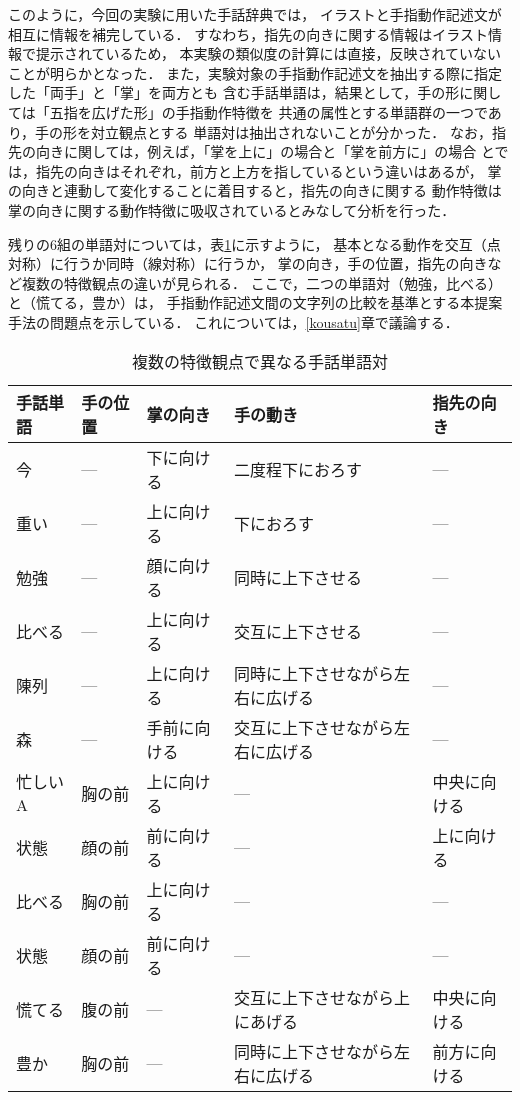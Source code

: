 このように，今回の実験に用いた手話辞典\cite{MaruyamaKoji1984}では，
イラストと手指動作記述文が相互に情報を補完している．
すなわち，指先の向きに関する情報はイラスト情報で提示されているため，
本実験の類似度の計算には直接，反映されていないことが明らかとなった．
また，実験対象の手指動作記述文を抽出する際に指定した「両手」と「掌」を両方とも
含む手話単語は，結果として，手の形に関しては「五指を広げた形」の手指動作特徴を
共通の属性とする単語群の一つであり，手の形を対立観点とする
単語対は抽出されないことが分かった．
なお，指先の向きに関しては，例えば，「掌を上に」の場合と「掌を前方に」の場合
とでは，指先の向きはそれぞれ，前方と上方を指しているという違いはあるが，
掌の向きと連動して変化することに着目すると，指先の向きに関する
動作特徴は掌の向きに関する動作特徴に吸収されているとみなして分析を行った．

残りの6組の単語対については，表\ref{kekka.35}に示すように，
基本となる動作を交互（点対称）に行うか同時（線対称）に行うか，
掌の向き，手の位置，指先の向きなど複数の特徴観点の違いが見られる．
ここで，二つの単語対（勉強，比べる）と（慌てる，豊か）は，
手指動作記述文間の文字列の比較を基準とする本提案手法の問題点を示している． 
これについては，\ref{kousatu}章で議論する．

\begin{table}[htbp]
\caption{複数の特徴観点で異なる手話単語対}
\label{kekka.35}
\begin{center}
\tabcolsep=3pt\footnotesize
\begin{tabular}{l|l|l|l|l}\hline
手話単語&手の位置&掌の向き &手の動き                        & 指先の向き \\
\hline\hline
 今   & --- & 下に向ける & 二度程下におろす & --- \\
重い  & --- & 上に向ける & 下におろす       & --- \\
\hline
勉強  & --- & 顔に向ける & 同時に上下させる & --- \\
比べる& --- & 上に向ける & 交互に上下させる & --- \\
\hline
陳列 & ---   &上に向ける&同時に上下させながら左右に広げる& ---        \\
森   & ---   &手前に向ける&交互に上下させながら左右に広げる& ---      \\
\hline
忙しいA&胸の前&上に向ける& ---                            & 中央に向ける\\
状態  &顔の前&前に向ける& ---                            & 上に向ける\\
\hline
比べる&胸の前&上に向ける& ---                            &  --- \\
状態  &顔の前&前に向ける& ---                            &  --- \\
\hline
慌てる&腹の前& ---      &交互に上下させながら上にあげる  & 中央に向ける\\
豊か  &胸の前& ---      &同時に上下させながら左右に広げる& 前方に向ける\\
\hline
\end{tabular}
\end{center}
\end{table}

